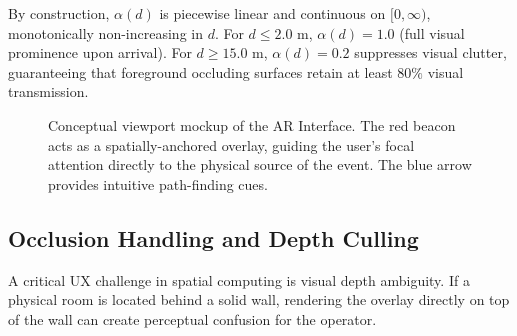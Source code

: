 \documentclass[conference]{IEEEtran}
\begin{document}
\begin{IEEEproof}
By construction, $\alpha(d)$ is piecewise linear and continuous on $[0, \infty)$, monotonically non-increasing in $d$. For $d \le 2.0\text{ m}$, $\alpha(d)=1.0$ (full visual prominence upon arrival). For $d \ge 15.0\text{ m}$, $\alpha(d)=0.2$ suppresses visual clutter, guaranteeing that foreground occluding surfaces retain at least $80\%$ visual transmission.
\end{IEEEproof}


\begin{figure}[htbp]
\centering
{}
\caption{Conceptual viewport mockup of the AR Interface. The red beacon acts as a spatially-anchored overlay, guiding the user's focal attention directly to the physical source of the event. The blue arrow provides intuitive path-finding cues.}
\label{fig:ar_view}
\end{figure}

\subsection{Occlusion Handling and Depth Culling}
A critical UX challenge in spatial computing is visual depth ambiguity. If a physical room is located behind a solid wall, rendering the overlay directly on top of the wall can create perceptual confusion for the operator.
\end{document}
